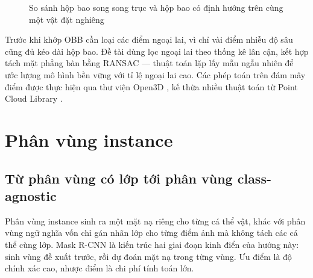\begin{figure}[H]
\centering
{}
\caption{So sánh hộp bao song song trục và hộp bao có định hướng trên cùng một vật đặt nghiêng}
\label{fig:obb}
\end{figure}

Trước khi khớp OBB cần loại các điểm ngoại lai, vì chỉ vài điểm nhiễu độ sâu cũng đủ kéo dài hộp
bao. Đề tài dùng lọc ngoại lai theo thống kê lân cận, kết hợp tách mặt phẳng bàn bằng RANSAC
\cite{fischler1981ransac} --- thuật toán lặp lấy mẫu ngẫu nhiên để ước lượng mô hình bền vững
với tỉ lệ ngoại lai cao. Các phép toán trên đám mây điểm được thực hiện qua thư viện Open3D
\cite{zhou2018open3d}, kế thừa nhiều thuật toán từ Point Cloud Library \cite{rusu2011pcl}.

\section{Phân vùng instance}

\subsection{Từ phân vùng có lớp tới phân vùng class-agnostic}

Phân vùng instance sinh ra một mặt nạ riêng cho từng cá thể vật, khác với phân vùng ngữ nghĩa
vốn chỉ gán nhãn lớp cho từng điểm ảnh mà không tách các cá thể cùng lớp. Mask R-CNN
\cite{he2017maskrcnn} là kiến trúc hai giai đoạn kinh điển của hướng này: sinh vùng đề xuất
trước, rồi dự đoán mặt nạ trong từng vùng. Ưu điểm là độ chính xác cao, nhược điểm là chi phí
tính toán lớn.

